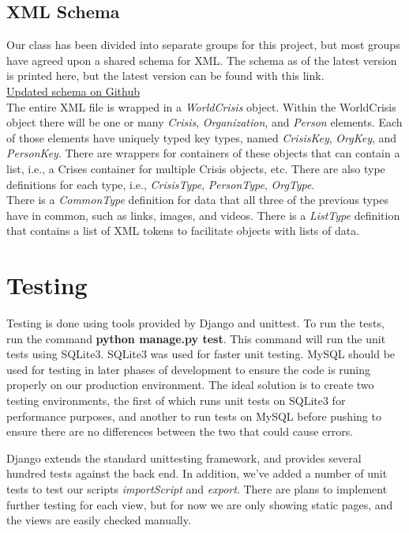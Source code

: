 \documentclass[12pt]{report}
\begin{document}
\subsection*{XML Schema}
\hfill


Our class has been divided into separate groups for this project, but most groups have agreed upon a shared schema for XML.
The schema as of the latest version is printed here, but the latest version can be found with this link.\\


\href{https://github.com/aaronj1335/cs373-wcdb1-schema/blob/master/WorldCrises.xsd.xml}{Updated schema on Github}\\


The entire XML file is wrapped in a \emph{WorldCrisis} object.
Within the WorldCrisis object there will be one or many \emph{Crisis}, \emph{Organization}, and \emph{Person} elements.
Each of those elements have uniquely typed key types, named \emph{CrisisKey}, \emph{OrgKey}, and \emph{PersonKey}.
There are wrappers for containers of these objects that can contain a list,
i.e., a Crises container for multiple Crisis objects, etc.
There are also type definitions for each type, i.e.,
\emph{CrisisType}, \emph{PersonType}, \emph{OrgType}.\\


There is a \emph{CommonType} definition for data that all three of the previous types have in common,
such as links, images, and videos.
There is a \emph{ListType} definition that contains a list of XML tokens to facilitate objects with lists of data.

\newpage
\section*{Testing}
\hfill


Testing is done using tools provided by Django and unittest.
To run the tests, run the command \textbf{python manage.py test}.
This command will run the unit tests using SQLite3.
SQLite3 was used for faster unit testing.
MySQL should be used for testing in later phases of development to ensure the code is runing properly on our production environment.
The ideal solution is to create two testing environments, the first of which runs unit tests on SQLite3 for performance purposes,
and another to run tests on MySQL before pushing to ensure there are no differences between the two that could cause errors.


Django extends the standard unittesting framework, and provides several hundred tests against the back end.
In addition, we've added a number of unit tests to test our scripts \emph{importScript} and \emph{export}.
There are plans to implement further testing for each view, but for now we are only showing static pages,
and the views are easily checked manually.
\end{document}
